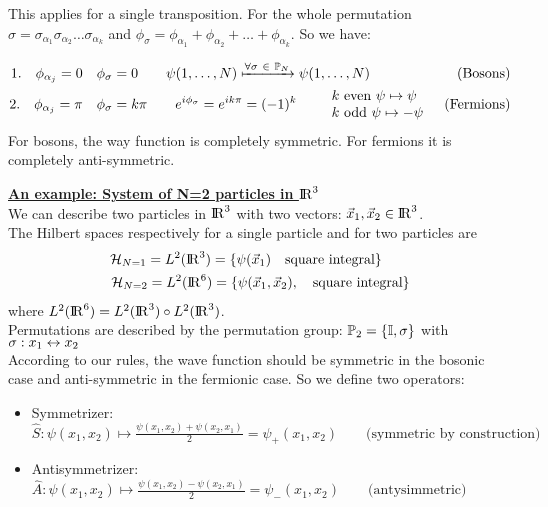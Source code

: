 This applies for a single transposition. For the whole permutation $\sigma = \sigma_{\alpha_1}\sigma_{\alpha_2}\dots\sigma_{\alpha_k}$ and $\phi_\sigma = \phi_{\alpha_1} + \phi_{\alpha_2} + \dots + \phi_{\alpha_k}$. So we have:

\begin{equation*}
    \begin{aligned}
        1. \quad \phi_{\alpha_j} = 0\quad &\phi_\sigma = 0 \qquad \psi(1,\dots, N) \xmapsto{\forall\sigma \ \in \ \mathbb{P}_N} \psi(1,\dots,N) &\text{(Bosons)}\\
        2. \quad \phi_{\alpha_j} = \pi \quad &\phi_\sigma = k\pi \qquad e^{i\phi_\sigma} = e^{ik\pi} = (-1)^k \qquad \begin{array}{l} \text{$k$ even } \psi \mapsto\psi \\ \text{$k$ odd } \psi \mapsto -\psi \end{array} &\text{(Fermions)}
    \end{aligned}
\end{equation*}
For bosons, the way function is completely symmetric. For fermions it is completely anti-symmetric. 


\vspace{20pt}
\underline{\textbf{An example: System of N=2 particles in ${\rm I\!R}^3$}}\\
We can describe two particles in ${\rm I\!R}^3$ with two vectors: $\vec x_1, \vec x_2 \in {\rm I\!R}^3$.\\
The Hilbert spaces respectively for a single particle and for two particles are 
\begin{align*}
    \mathcal{H}_{N=1} = L^2({\rm I\!R}^3) = \{\psi(\vec x_1)\quad \text{square integral}\} \qquad\\
    \mathcal{H}_{N=2} = L^2({\rm I\!R}^6) = \{\psi(\vec x_1, \vec x_2), \quad \text{square integral}\}
\end{align*}
where $L^2({\rm I\!R}^6) = L^2({\rm I\!R}^3) \circ L^2({\rm I\!R}^3)$.\\
Permutations are described by the permutation group: $\mathbb{P}_2 = \{\mathbb{I}, \sigma\}$ \quad with $\sigma : x_1 \leftrightarrow x_2$\\
According to our rules, the wave function should be symmetric in the bosonic case and anti-symmetric in the fermionic case. So we define two operators:
\begin{itemize}
    \item Symmetrizer: $\widehat S: \psi(x_1,x_2) \mapsto \frac{\psi(x_1,x_2) + \psi(x_2, x_1)}2 = \psi_+(x_1,x_2) \qquad \text{(symmetric by construction)}$
    \item Antisymmetrizer: $\widehat A : \psi(x_1,x_2) \mapsto \frac{\psi(x_1,x_2) - \psi(x_2, x_1)}2 = \psi_-(x_1,x_2) \qquad \text{(antysimmetric)}$
\end{itemize}

